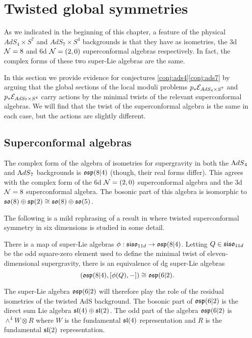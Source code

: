 \documentclass[../main.tex]{subfiles}
\begin{document}
 

\section{Twisted global symmetries}
\label{sec:ads}
As we indicated in the beginning of this chapter, a feature of the physical $AdS_4\times S^7$ and $AdS_7\times S^4$ backgrounds is that they have as isometries, the 3d $\mathcal{N}=8$ and 6d $\mathcal{N}=(2,0)$ superconformal algebras respectively. In fact, the complex forms of these two super-Lie algebras are the same. 

In this section we provide evidence for conjectures \ref{conj:ads4}\ref{conj:ads7} by arguing that the global sections of the local moduli problems $p_*\mathcal{E}_{AdS_4\times S^7}$ and $p_* \mathcal{E}_{AdS_7\times S^4}$ carry actions by the minimal twists of the relevant superconformal algebras. We will find that the twist of the superconformal algebra is the same in each case, but the actions are slightly different. 

\subsection{Superconformal algebras}

The complex form of the algebra of isometries for supergravity in both the ${\mathrm{A}dS}_4$ and ${\mathrm{A}dS}_7$ backgrounds is $\mathfrak{osp}(8|4)$ (though, their real forms differ). 
This agrees with the complex form of the 6d $\mathcal{N}=(2,0)$ superconformal algebra and the 3d $\mathcal{N}=8$ superconformal algebra. The bosonic part of this algebra is isomorphic to $\mathfrak{so}(8) \oplus \mathfrak{sp}(2) \cong \mathfrak{so}(8) \oplus \mathfrak{so}(5)$. 

The following is a mild rephrasing of a result in \cite{SWsuco2} where twisted superconformal symmetry in six dimensions is studied in some detail. 
\begin{thm}
There is a map of super-Lie algebras $\phi: \mathfrak{siso}_{11d} \to \mathfrak{osp}(8|4)$. Letting $Q\in \mathfrak{siso}_{11d}$ be the odd square-zero element used to define the minimal twist of eleven-dimensional supergravity, there is an equivalence of dg super-Lie algebras \[\left ( \mathfrak{osp}(8|4), [\phi(Q), - ]\right )\cong \mathfrak{osp}(6|2).\]
\end{thm}

The super-Lie algebra $\mathfrak{osp}(6|2)$ will therefore play the role of the residual isometries of the twisted AdS background. The bosonic part of $\mathfrak{osp}(6|2)$ is the direct sum Lie algebra $\mathfrak{sl}(4) \oplus \mathfrak{sl}(2)$. The odd part of the algebra $\mathfrak{osp}(6|2)$ is $\wedge^4 W \otimes R$ where $W$ is the fundamental $\mathfrak{sl}(4)$ representation and $R$ is the fundamental $\mathfrak{sl}(2)$ representation. 
\end{document}
